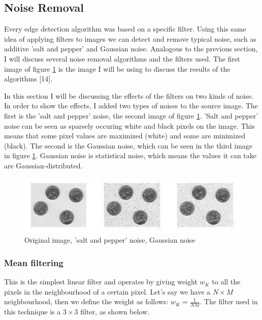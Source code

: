 \documentclass[12pt]{article}
\begin{document}
\subsection{Noise Removal}

Every edge detection algorithm was based on a specific filter. Using this same idea of applying filters to images we can detect and remove typical noise, such as additive 'salt and pepper' and Gaussian noise. Analogous to the previous section, I will discuss several noise removal algorithms and the filters used. The first image of figure \ref{noise_original} is the image I will be using to discuss the results of the algorithms [14].
\newline

In this section I will be discussing the effects of the filters on two kinds of noise. In order to show the effects, I added two types of noises to the source image. The first is the 'salt and pepper' noise, the second image of figure \ref{noise_original}. 'Salt and pepper' noise can be seen as sparsely occuring white and black pixels on the image. This means that some pixel values are maximized (white) and some are minimized (black). The second is the Gaussian noise, which can be seen in the third image in figure \ref{noise_original}. Gaussian noise is statistical noise, which means the values it can take are Gaussian-distributed.

\begin{figure}[h]
\hspace*{-0.8cm}
\centering
\includegraphics[scale = 1]{img/noise_orig}
\caption{Original image, 'salt and pepper' noise, Gaussian noise}
\label{noise_original}
\end{figure}

\subsubsection{Mean filtering}

This is the simplest linear filter and operates by giving weight $w_K$ to all the pixels in the neighbourhood of a certain pixel. Let's say we have a $N\times M$ neighbourhood, then we define the weight as follows: $w_K = \frac{1}{NM}$. The filter used in this technique is a $3\times3$ filter, as shown below.
\newline
\newline
\end{document}
